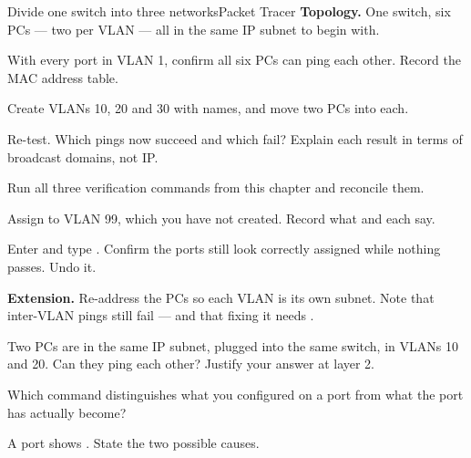 \begin{lab}{Divide one switch into three networks}{Packet Tracer}
\textbf{Topology.} One switch, six PCs --- two per VLAN --- all in the same IP
subnet to begin with.

\begin{tasks}
  \item With every port in VLAN 1, confirm all six PCs can ping each other.
        Record the MAC address table.
  \item Create VLANs 10, 20 and 30 with names, and move two PCs into each.
  \item Re-test. Which pings now succeed and which fail? Explain each result in
        terms of broadcast domains, not IP.
  \item Run all three verification commands from this chapter and reconcile them.
  \item Assign  to VLAN 99, which you have not created. Record what
         and  each say.
  \item Enter  and type . Confirm the ports still look
        correctly assigned while nothing passes. Undo it.
  \item \textbf{Extension.} Re-address the PCs so each VLAN is its own subnet.
        Note that inter-VLAN pings still fail --- and that fixing it needs
        .
\end{tasks}
\end{lab}

\begin{checkpoint}
\begin{tightnum}
  \item Two PCs are in the same IP subnet, plugged into the same switch, in
        VLANs 10 and 20. Can they ping each other? Justify your answer at layer 2.
  \item Which command distinguishes what you configured on a port from what the
        port has actually become?
  \item A port shows . State the two
        possible causes.
\end{tightnum}
\end{checkpoint}

